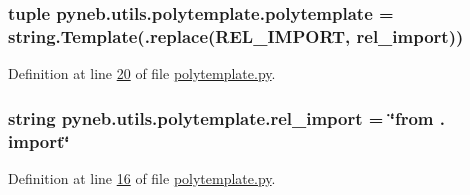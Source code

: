 \subsubsection[{polytemplate}]{\setlength{\rightskip}{0pt plus 5cm}tuple pyneb.\+utils.\+polytemplate.\+polytemplate = string.\+Template(.replace(\textquotesingle{}R\+E\+L\+\_\+\+I\+M\+P\+O\+R\+T\textquotesingle{}, {\bf rel\+\_\+import}))}\label{namespacepyneb_1_1utils_1_1polytemplate_ad80e38c107bba3d56d77ce573d1e6d31}


Definition at line \hyperlink{polytemplate_8py_source_l00020}{20} of file \hyperlink{polytemplate_8py_source}{polytemplate.\+py}.

\hypertarget{namespacepyneb_1_1utils_1_1polytemplate_af687173fec33101d65eb86ef900d1ae8}{}
\subsubsection[{rel\+\_\+import}]{\setlength{\rightskip}{0pt plus 5cm}string pyneb.\+utils.\+polytemplate.\+rel\+\_\+import = \char`\"{}from . import\char`\"{}}\label{namespacepyneb_1_1utils_1_1polytemplate_af687173fec33101d65eb86ef900d1ae8}


Definition at line \hyperlink{polytemplate_8py_source_l00016}{16} of file \hyperlink{polytemplate_8py_source}{polytemplate.\+py}.

